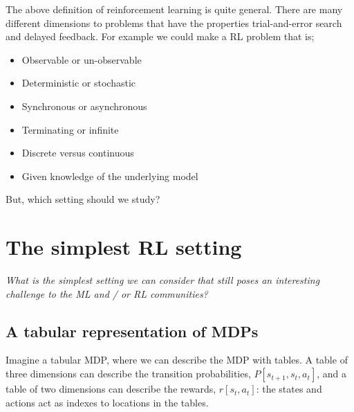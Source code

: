 
The above definition of reinforcement learning is quite general. There are many
different dimensions to problems that have the properties trial-and-error search and
delayed feedback. For example we could make a RL problem that is;

\begin{itemize}
\tightlist
\item
  Observable or un-observable
\item
  Deterministic or stochastic
\item
  Synchronous or asynchronous
\item
  Terminating or infinite
\item
  Discrete versus continuous
\item
  Given knowledge of the underlying model
\end{itemize}

\begin{displayquote}
  But, which setting should we study?
\end{displayquote}



\section{The simplest RL setting}

\begin{displayquote}
  \textit{What is the simplest setting we can consider that still poses an
  interesting challenge to the ML and / or RL communities?}
\end{displayquote}

\hypertarget{a-tabular-representation-of-mdps}{%
\subsection{A tabular representation of MDPs}\label{a-tabular-representation-of-mdps}}

Imagine a tabular MDP, where we can describe the MDP with tables.
A table of three dimensions can describe the transition probabilities, $P[s_{t+1}, s_t, a_t]$,
and a table of two dimensions can describe the rewards, $r[s_t, a_t]$: the states and actions
act as indexes to locations in the tables.

